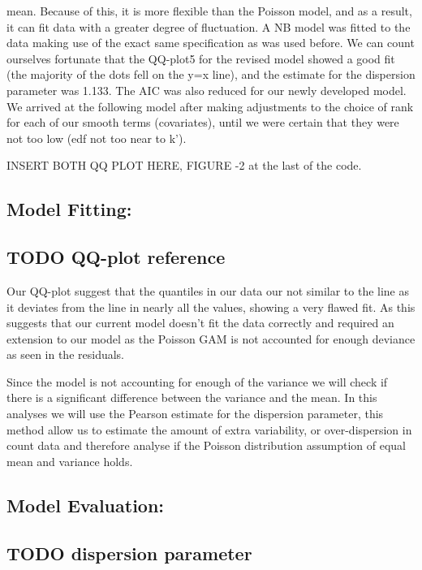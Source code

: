 \documentclass[
  letterpaper,
  DIV=11,
  numbers=noendperiod]{scrartcl}
\begin{document}
mean. Because of this, it is more flexible than the Poisson model, and
as a result, it can fit data with a greater degree of fluctuation. A NB
model was fitted to the data making use of the exact same specification
as was used before. We can count ourselves fortunate that the QQ-plot5
for the revised model showed a good fit (the majority of the dots fell
on the y=x line), and the estimate for the dispersion parameter was
1.133. The AIC was also reduced for our newly developed model. We
arrived at the following model after making adjustments to the choice of
rank for each of our smooth terms (covariates), until we were certain
that they were not too low (edf not too near to k').

INSERT BOTH QQ PLOT HERE, FIGURE -2 at the last of the code.

\hypertarget{model-fitting}{%
\subsection{Model Fitting:}\label{model-fitting}}

\hypertarget{todo-qq-plot-reference}{%
\subsection{TODO QQ-plot reference}\label{todo-qq-plot-reference}}

Our QQ-plot suggest that the quantiles in our data our not similar to
the line as it deviates from the line in nearly all the values, showing
a very flawed fit. As this suggests that our current model doesn't fit
the data correctly and required an extension to our model as the Poisson
GAM is not accounted for enough deviance as seen in the residuals.

Since the model is not accounting for enough of the variance we will
check if there is a significant difference between the variance and the
mean. In this analyses we will use the Pearson estimate for the
dispersion parameter, this method allow us to estimate the amount of
extra variability, or over-dispersion in count data and therefore
analyse if the Poisson distribution assumption of equal mean and
variance holds.

\hypertarget{model-evaluation}{%
\subsection{Model Evaluation:}\label{model-evaluation}}

\hypertarget{todo-dispersion-parameter}{%
\subsection{TODO dispersion parameter}\label{todo-dispersion-parameter}}
\end{document}

